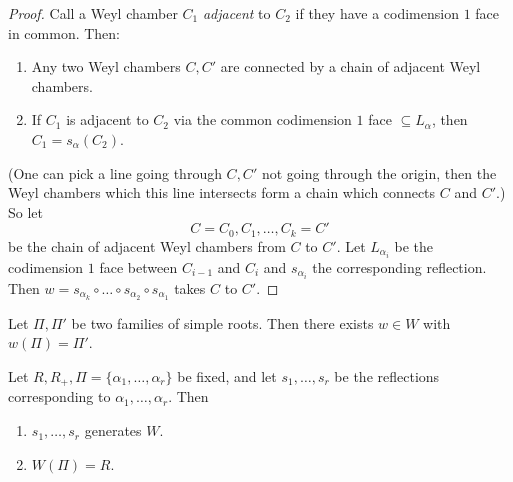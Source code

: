 \begin{proof}
  Call a Weyl chamber
  $C_1$ \emph{adjacent} to $C_2$
  if they have a codimension $1$
  face in common. Then:
  \begin{enumerate}
    \item Any two Weyl chambers
      $C, C'$
      are connected by a chain of
      adjacent Weyl chambers.
    \item If $C_1$ is adjacent to
      $C_2$ via the common
      codimension $1$ face
      $\subseteq L_\alpha$, then
      $C_1 = s_\alpha(C_2)$.
  \end{enumerate}
  (One can pick a line going through
  $C, C'$ not going through the
  origin, then the Weyl chambers
  which this line intersects form a
  chain which connects $C$ and $C'$.)
  So let
  \[
    C = C_0, C_1, \ldots, C_k = C'
  \]
  be the chain of adjacent Weyl
  chambers from $C$ to $C'$.
  Let $L_{\alpha_i}$
  be the codimension $1$ face
  between $C_{i-1}$ and $C_i$ and
  $s_{\alpha_i}$ the
  corresponding reflection. Then
  $w = s_{\alpha_k} \circ \dots \circ s_{\alpha_2} \circ s_{\alpha_1}$ takes
  $C$ to $C'$.
\end{proof}

\begin{corollary}
  Let $\Pi, \Pi'$ be two families
  of simple roots. Then there
  exists $w \in W$ with
  $w(\Pi) = \Pi'$.
\end{corollary}

\begin{theorem}
  Let $R, R_+, \Pi = \{\alpha_1, \dots, \alpha_r\}$
  be fixed, and let
  $s_1, \dots, s_r$ be the reflections
  corresponding to $\alpha_1, \dots, \alpha_r$. Then
  \begin{enumerate}
    \item $s_1, \dots, s_r$ generates
      $W$.
    \item $W(\Pi) = R$.
  \end{enumerate}
\end{theorem}

